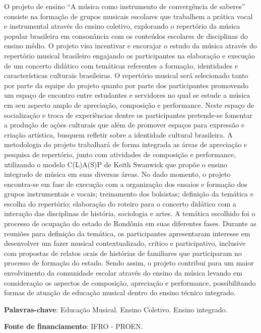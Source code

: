 \documentclass[article,12pt,onesidea,4paper,english,brazil]{abntex2}
\begin{document}
	\noindent O projeto de ensino “A música como instrumento de convergência de saberes”
	consiste na formação de grupos musicais escolares que trabalhem a prática vocal e
	instrumental através do ensino coletivo, explorando o repertório da música popular
	brasileira em consonância com os conteúdos escolares de disciplinas do ensino
	médio. O projeto visa incentivar e encorajar o estudo da música através do repertório
	musical brasileiro engajando os participantes na elaboração e execução de um
	concerto didático com temáticas referentes a formação, identidades e características
	culturais brasileiras. O repertório musical será selecionado tanto por parte da equipe
	do projeto quanto por parte dos participantes promovendo um espaço de encontro
	entre estudantes e servidores no qual se estude a música em seu aspecto amplo de
	apreciação, composição e performance. Neste espaço de socialização e troca de
	experiências dentre os participantes pretende-se fomentar a produção de ações
	culturais que além de promover espaços para expressão e criação artística,
	busquem refletir sobre a identidade cultural brasileira. A metodologia do projeto
	trabalhará de forma integrada as áreas de apreciação e pesquisa de repertório, junto
	com atividades de composição e performance, utilizando o modelo C(L)A(S)P de
	Keith Swanwick que propõe o ensino integrado de música em suas diversas áreas.
	No dado momento, o projeto encontra-se em fase de execução com a organização
	dos ensaios e formação dos grupos instrumentais e vocais; treinamento dos
	bolsistas; definição da temática e escolha do repertório; elaboração do roteiro para o
	concerto didático com a interação das disciplinas de história, sociologia e artes. A
	temática escolhido foi o processo de ocupação do estado de Rondônia em suas
	diferentes fases. Durante as reuniões para definição da temática, os participantes
	apresentaram interesse em desenvolver um fazer musical contextualizado, crítico e
	participativo, inclusive com propostas de relatos orais de histórias de familiares que
	participaram no processo de formação do estado. Sendo assim, o projeto contribui
	para um maior envolvimento da comunidade escolar através do ensino da música
	levando em consideração os aspectos de composição, apreciação e performance,
	possibilitando formas de atuação de educação musical dentro do ensino técnico
	integrado.
	
	\vspace{\onelineskip}
	
	\noindent
	\textbf{Palavras-chave}: Educação Musical. Ensino Coletivo. Ensino integrado.
	
	\vspace{\onelineskip}
	
	\noindent
	\textbf{Fonte de financiamento}: IFRO - PROEN.
	
\end{document}
